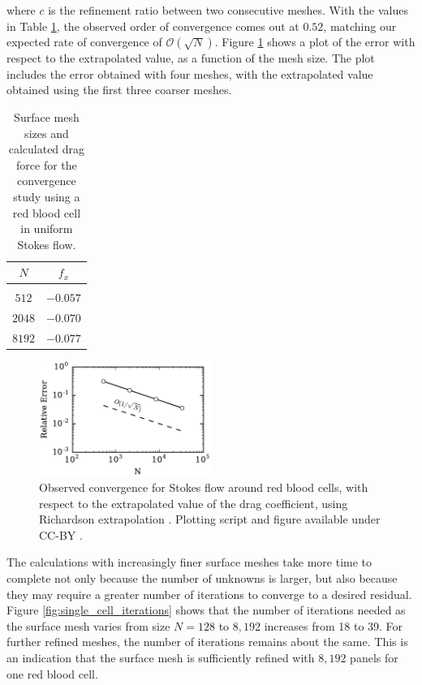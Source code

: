 \documentclass[final,3p,times]{elsarticle}
\renewcommand{\O}[1]{\mathcal{O}(#1)}
\begin{document}
\noindent where $c$ is the refinement ratio between two consecutive meshes. With the values in Table \ref{tab:rbc_richardson_values}, the observed order of convergence comes out at $0.52$, matching our expected rate of convergence of $\O{\sqrt{N}}$. 
Figure \ref{fig:rbc_extrapolated_convergence} shows a plot of the error with respect to the extrapolated value, as a function of the mesh size. The plot includes the error obtained with four meshes, with the extrapolated value obtained using the first three coarser meshes.

\begin{table}[h]
\footnotesize
\begin{center}
\begin{tabular}{c|c}
	$N$ & $f_x$ \\
	\hline
	& \\
	$512$ & $-0.057$ \\
	$2048$ & $-0.070$ \\ 
	$8192$ & $-0.077$ \\
\end{tabular}
\end{center}
\caption{Surface mesh sizes and calculated drag force for the convergence study using a red blood cell in uniform Stokes flow.}
\label{tab:rbc_richardson_values}
\end{table}%


\begin{figure}
\begin{center}
	\includegraphics[natwidth=3in,natheight=2in,width=0.5\textwidth]{EthrocyteConvergence.pdf}
	\caption{Observed convergence for Stokes flow around red blood cells, with respect to the extrapolated value of the drag coefficient, using Richardson extrapolation \cite{roache1998}. Plotting script and figure available under CC-BY \cite{WangLaytonBarba2016-figshare4}.}
	\label{fig:rbc_extrapolated_convergence}
\end{center}
\end{figure}


The calculations with increasingly finer surface meshes take more time to complete not only because the number of unknowns is larger, but also because they may require a greater number of iterations to converge to a desired residual.
Figure \ref{fig:single_cell_iterations} shows that the number of iterations needed as the surface mesh varies from size $N=128$ to $8,192$ increases from 18 to 39. For further refined meshes, the number of iterations remains about the same. This is an indication that the surface mesh is sufficiently refined with $8,192$ panels for one red blood cell.
\end{document}
